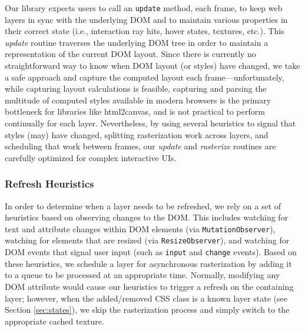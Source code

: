 \documentclass[sigconf]{acmart}
\begin{document}
Our library expects users to call an \verb|update| method, each frame, to keep web layers in sync with the underlying DOM and to maintain various properties in their correct state (i.e., interaction ray hits, hover states, textures, etc.). This \textit{update} routine traverses the underlying DOM tree in order to maintain a representation of the current DOM layout. Since there is currently no straightforward way to know when DOM layout (or styles) have changed, we take a safe approach and capture the computed layout each frame---unfortunately, while capturing layout calculations is feasible, capturing and parsing the multitude of computed styles available in modern browsers is the primary bottleneck for libraries like html2canvas, and is not practical to perform continually for each layer. Nevertheless, by using several heuristics to signal that styles (may) have changed, splitting rasterization work across layers, and scheduling that work between frames, our \textit{update} and \textit{rasterize} routines are carefully optimized for complex interactive UIs. 


\subsubsection{Refresh Heuristics} 
\label{sec:refresh} In order to determine when a layer needs to be refreshed, we rely on a set of heuristics based on observing changes to the DOM. This includes watching for text and attribute changes within DOM elements (via \verb|MutationObserver|), watching for elements that are resized (via \verb|ResizeObserver|), and watching for DOM events that signal user input (such as \verb|input| and \verb|change| events). Based on these heuristics, we schedule a layer for asynchronous rasterization by adding it to a queue to be processed at an appropriate time. Normally, modifying any DOM attribute would cause our heuristics to trigger a refresh on the containing layer; however, when the added/removed CSS class is a known layer state (see Section \ref{sec:states}), we skip the rasterization process and simply switch to the appropriate cached texture.
\end{document}
